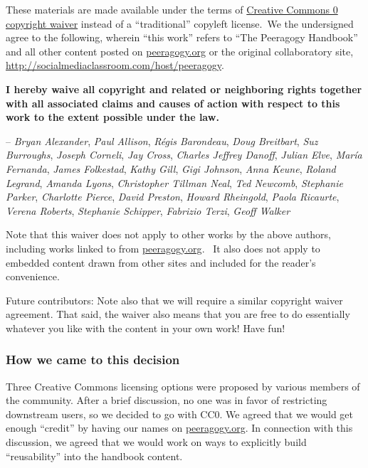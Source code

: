 These materials are made available under the terms of
\href{http://creativecommons.org/publicdomain/zero/1.0/}{Creative
Commons 0 copyright waiver} instead of a ``traditional'' copyleft
license.~We the undersigned agree to the following, wherein ``this
work'' refers to ``The Peeragogy Handbook'' and all other content posted
on \href{http://peeragogy.org}{peeragogy.org} or the original
collaboratory site,
\href{http://socialmediaclassroom.com/host/peeragogy}{http://socialmediaclassroom.com/host/peeragogy}.

\textbf{I hereby waive all copyright and related or neighboring rights
together with all associated claims and causes of action with respect to
this work to the extent possible under the law.}

-- \emph{Bryan Alexander}, \emph{Paul Allison}, \emph{Régis Barondeau}, \emph{Doug Breitbart}, \emph{Suz Burroughs}, \emph{Joseph Corneli}, \emph{Jay Cross}, \emph{Charles Jeffrey Danoff}, \emph{Julian Elve}, \emph{María Fernanda}, \emph{James Folkestad}, \emph{Kathy Gill}, \emph{Gigi Johnson}, \emph{Anna Keune}, \emph{Roland Legrand}, \emph{Amanda Lyons}, \emph{Christopher Tillman Neal}, \emph{Ted Newcomb}, \emph{Stephanie Parker}, \emph{Charlotte Pierce}, \emph{David Preston}, \emph{Howard Rheingold}, \emph{Paola Ricaurte}, \emph{Verena Roberts}, \emph{Stephanie Schipper}, \emph{Fabrizio Terzi}, \emph{Geoff Walker}

Note that this waiver does not apply to other works by the above
authors, including works linked to from
\href{http://peeragogy.org}{peeragogy.org}.~ It also does not apply to
embedded content drawn from other sites and included for the reader's
convenience.

Future contributors: Note also that we will require a similar copyright
waiver agreement. That said, the waiver also means that you are free to
do essentially whatever you like with the content in your own work! Have
fun!

\subsubsection{How we came to this decision}

Three Creative Commons licensing options were proposed by
various members of the community.  After a brief
discussion, no one was in favor of restricting downstream
users, so we decided to go with CC0. We agreed that we
would get enough ``credit'' by having our names on
\href{http://peeragogy.org/}{peeragogy.org}. In connection with this
discussion, we agreed that we would work on ways to explicitly build
``reusability'' into the handbook content.
